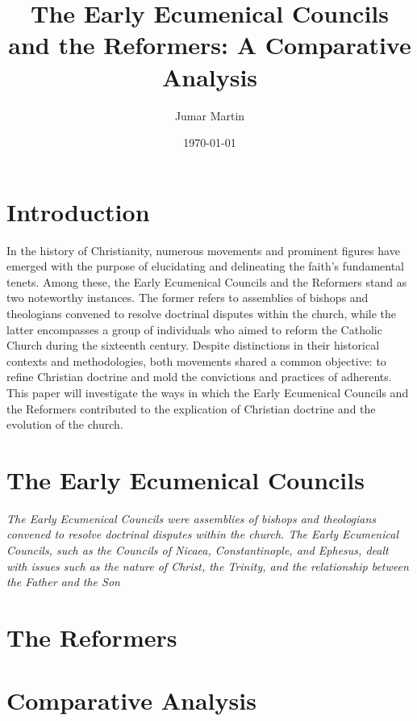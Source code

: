 \documentclass[12pt]{article}
\author{Jumar Martin}
\title{The Early Ecumenical Councils and the Reformers: A Comparative Analysis}
\date{\today}
\begin{document}
\maketitle
\tableofcontents
\newpage

\section{Introduction}
 In the history of Christianity, numerous movements and prominent figures have emerged with the purpose of elucidating and delineating the faith's fundamental tenets.
 Among these, the Early Ecumenical Councils and the Reformers stand as two noteworthy instances.
 The former refers to assemblies of bishops and theologians convened to resolve doctrinal disputes within the church, while the latter encompasses a group of individuals who aimed to reform the Catholic Church during the sixteenth century.
 Despite distinctions in their historical contexts and methodologies, both movements shared a common objective: to refine Christian doctrine and mold the convictions and practices of adherents.
 This paper will investigate the ways in which the Early Ecumenical Councils and the Reformers contributed to the explication of Christian doctrine and the evolution of the church.

\section{The Early Ecumenical Councils}
\textit{The Early Ecumenical Councils were assemblies of bishops and theologians convened to resolve doctrinal disputes within the church.
The Early Ecumenical Councils, such as the Councils of Nicaea, Constantinople, and Ephesus, dealt with issues such as the nature of Christ, the Trinity, and the relationship between the Father and the Son}
\section{The Reformers}
\section{Comparative Analysis}
\printbibliography
\end{document}
